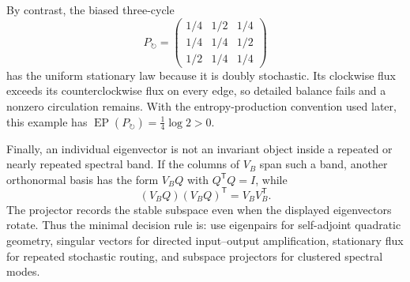 By contrast, the biased three-cycle
\begin{equation}
P_{\circlearrowright}
=\begin{pmatrix}
1/4&1/2&1/4\\
1/4&1/4&1/2\\
1/2&1/4&1/4
\end{pmatrix}
\label{eq:book-primer-directed-cycle}
\end{equation}
has the uniform stationary law because it is doubly stochastic.  Its clockwise flux exceeds its
counterclockwise flux on every edge, so detailed balance fails and a nonzero circulation remains.
With the entropy-production convention used later, this example has
$\operatorname{EP}(P_{\circlearrowright})=\tfrac14\log2>0$.

Finally, an individual eigenvector is not an invariant object inside a repeated or nearly repeated
spectral band.  If the columns of $V_B$ span such a band, another orthonormal basis has the form
$V_BQ$ with $Q^{\mathsf T}Q=I$, while
\begin{equation}
(V_BQ)(V_BQ)^{\mathsf T}=V_BV_B^{\mathsf T}.
\label{eq:book-primer-band-projector}
\end{equation}
The projector records the stable subspace even when the displayed eigenvectors rotate.  Thus the
minimal decision rule is: use eigenpairs for self-adjoint quadratic geometry, singular vectors for
directed input--output amplification, stationary flux for repeated stochastic routing, and
subspace projectors for clustered spectral modes.
